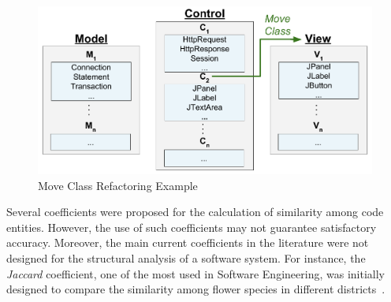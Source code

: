 \documentclass[smallextended,natbib]{svjour3}
\begin{document}
\begin{figure}[ht]
\centering
\includegraphics[scale=0.26]{exemintro.png}
\caption{Move Class Refactoring Example}
\label{fig:intro}
\vspace{-0.5cm}
\end{figure}

Several coefficients were proposed for the calculation of similarity among code entities. However, the use of such coefficients may not guarantee satisfactory accuracy. Moreover, the main current coefficients in the literature were not designed for the structural analysis of a software system. For instance, the \textit{Jaccard} coefficient, one of the most used in Software Engineering, was initially designed to compare the similarity among flower species in different districts~\citep{jaccard1912}.
\end{document}
